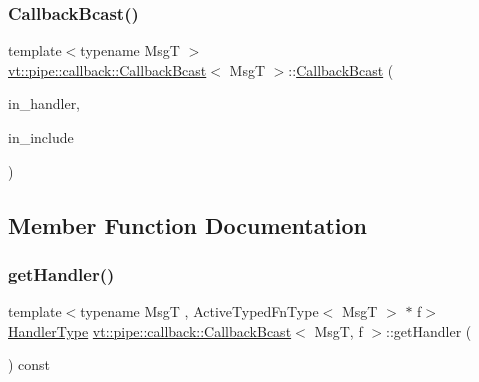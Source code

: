 \subsubsection{\texorpdfstring{Callback\+Bcast()}{CallbackBcast()}\hspace{0.1cm}{\footnotesize\ttfamily [4/4]}}
{\footnotesize\ttfamily template$<$typename MsgT $>$ \\
\hyperlink{structvt_1_1pipe_1_1callback_1_1_callback_bcast}{vt\+::pipe\+::callback\+::\+Callback\+Bcast}$<$ MsgT $>$\+::\hyperlink{structvt_1_1pipe_1_1callback_1_1_callback_bcast}{Callback\+Bcast} (\begin{DoxyParamCaption}\item[{\hyperlink{namespacevt_af64846b57dfcaf104da3ef6967917573}{Handler\+Type} const}]{in\+\_\+handler,  }\item[{bool const \&}]{in\+\_\+include }\end{DoxyParamCaption})}



\subsection{Member Function Documentation}
\mbox{\label{structvt_1_1pipe_1_1callback_1_1_callback_bcast_a7585164f2854f2af3f23af0e0468e0c8}} 
\subsubsection{\texorpdfstring{get\+Handler()}{getHandler()}}
{\footnotesize\ttfamily template$<$typename MsgT , Active\+Typed\+Fn\+Type$<$ Msg\+T $>$ $\ast$ f$>$ \\
\hyperlink{namespacevt_af64846b57dfcaf104da3ef6967917573}{Handler\+Type} \hyperlink{structvt_1_1pipe_1_1callback_1_1_callback_bcast}{vt\+::pipe\+::callback\+::\+Callback\+Bcast}$<$ MsgT, f $>$\+::get\+Handler (\begin{DoxyParamCaption}{ }\end{DoxyParamCaption}) const\hspace{0.3cm}{\ttfamily [inline]}}

\mbox{\label{structvt_1_1pipe_1_1callback_1_1_callback_bcast_a44fca909dc3216da6c84a6277649fa6e}} 
